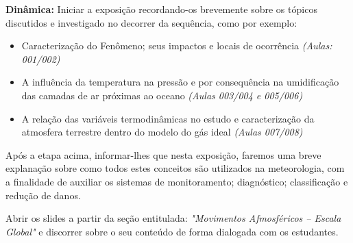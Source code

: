 \documentclass[
12pt,				%
openright,			%
oneside,			%
a4paper,			%
chapter=TITLE,		%
english,			%
brazil				%
]{abntex2}
\begin{document}
\noindent\textbf{Dinâmica:} Iniciar a exposição recordando-os brevemente sobre os tópicos discutidos e investigado no decorrer da sequência, como por exemplo:
\begin{itemize}
		\item Caracterização do Fenômeno; seus impactos e locais de ocorrência \textit{(Aulas: 001/002)}
		\item A influência da temperatura na pressão e por consequência na umidificação das camadas de ar próximas ao oceano \textit{(Aulas 003/004 e 005/006)}
		\item A relação das variáveis termodinâmicas no estudo e caracterização da atmosfera terrestre dentro do modelo do gás ideal \textit{(Aulas 007/008)}
\end{itemize}
Após a etapa acima, informar-lhes que nesta exposição, faremos uma breve explanação sobre como todos estes conceitos são utilizados na meteorologia, com a finalidade de auxiliar os sistemas de monitoramento; diagnóstico; classificação e redução de danos.

Abrir os slides a partir da seção entitulada: \textit{"Movimentos Afmosféricos -- Escala Global"} e discorrer sobre o seu conteúdo de forma dialogada com os estudantes.
\end{document}
